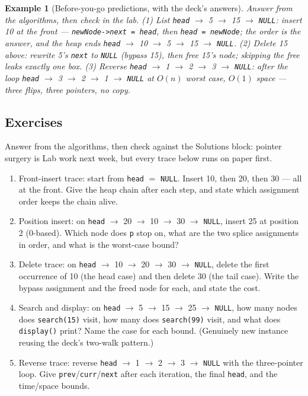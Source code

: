 \documentclass[11pt]{article}
\newtheorem{example}{Example}[section]
\begin{document}
\begin{example}[Before-you-go predictions, with the deck's answers]
Answer from the algorithms, then check in the lab. (1) List \texttt{head} $\to$ 5 $\to$ 15 $\to$ \texttt{NULL}: insert 10 at the front --- \texttt{newNode->next = head}, then \texttt{head = newNode}; the order is the answer, and the heap ends \texttt{head} $\to$ 10 $\to$ 5 $\to$ 15 $\to$ \texttt{NULL}. (2) Delete 15 above: rewrite 5's \texttt{next} to \texttt{NULL} (bypass 15), then free 15's node; skipping the free leaks exactly one box. (3) Reverse \texttt{head} $\to$ 1 $\to$ 2 $\to$ 3 $\to$ \texttt{NULL}: after the loop \texttt{head} $\to$ 3 $\to$ 2 $\to$ 1 $\to$ \texttt{NULL} at $O(n)$ worst case, $O(1)$ space --- three flips, three pointers, no copy.
\end{example}

\subsection*{Exercises}

Answer from the algorithms, then check against the Solutions block: pointer surgery is Lab work next week, but every trace below runs on paper first.
\begin{enumerate}
  \item Front-insert trace: start from \texttt{head} $=$ \texttt{NULL}. Insert 10, then 20, then 30 --- all at the front. Give the heap chain after each step, and state which assignment order keeps the chain alive.
  \item Position insert: on \texttt{head} $\to$ 20 $\to$ 10 $\to$ 30 $\to$ \texttt{NULL}, insert 25 at position 2 (0-based). Which node does \texttt{p} stop on, what are the two splice assignments in order, and what is the worst-case bound?
  \item Delete trace: on \texttt{head} $\to$ 10 $\to$ 20 $\to$ 30 $\to$ \texttt{NULL}, delete the first occurrence of 10 (the head case) and then delete 30 (the tail case). Write the bypass assignment and the freed node for each, and state the cost.
  \item Search and display: on \texttt{head} $\to$ 5 $\to$ 15 $\to$ 25 $\to$ \texttt{NULL}, how many nodes does \texttt{search(15)} visit, how many does \texttt{search(99)} visit, and what does \texttt{display()} print? Name the case for each bound. (Genuinely new instance reusing the deck's two-walk pattern.)
  \item Reverse trace: reverse \texttt{head} $\to$ 1 $\to$ 2 $\to$ 3 $\to$ \texttt{NULL} with the three-pointer loop. Give \texttt{prev}/\texttt{curr}/\texttt{next} after each iteration, the final \texttt{head}, and the time/space bounds.
\end{enumerate}
\end{document}
